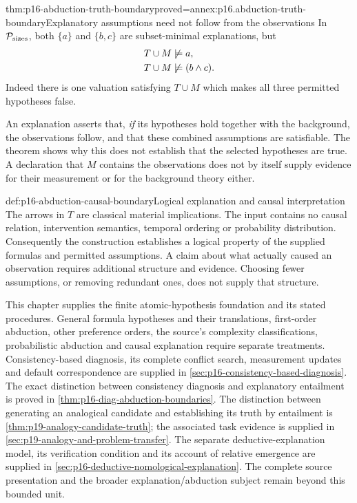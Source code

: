 \begin{hbtheorem}{thm:p16-abduction-truth-boundary}{proved=annex:p16.abduction-truth-boundary}{Explanatory assumptions need not follow from the observations}
In \(\mathcal P_{\rm sizes}\), both \(\{a\}\) and \(\{b,c\}\)
are subset-minimal explanations, but
\[
\begin{aligned}
 T\cup M&\not\models a,\\
 T\cup M&\not\models(b\land c).
\end{aligned}
\]
Indeed there is one valuation satisfying \(T\cup M\) which makes all
three permitted hypotheses false.
\end{hbtheorem}

An explanation asserts that, \emph{if} its hypotheses hold together with
the background, the observations follow, and that these combined assumptions
are satisfiable. The theorem shows why this does not establish that the
selected hypotheses are true. A declaration that \(M\) contains the
observations does not by itself supply evidence for their measurement or for
the background theory either.

\begin{hbwarning}{def:p16-abduction-causal-boundary}{Logical explanation and causal interpretation}
The arrows in \(T\) are classical material implications. The input
contains no causal relation, intervention semantics, temporal ordering or
probability distribution. Consequently the construction establishes a
logical property of the supplied formulas and permitted assumptions. A
claim about what actually caused an observation requires additional
structure and evidence. Choosing fewer assumptions, or removing redundant
ones, does not supply that structure.

This chapter supplies the finite atomic-hypothesis foundation and its stated
procedures. General formula hypotheses and their translations, first-order
abduction, other preference orders, the source's complexity classifications,
probabilistic abduction and causal explanation require separate treatments.
Consistency-based diagnosis, its complete conflict search, measurement
updates and default correspondence are supplied in
\cref{sec:p16-consistency-based-diagnosis}.
The exact distinction between consistency diagnosis and explanatory
entailment is proved in \cref{thm:p16-diag-abduction-boundaries}.
The distinction between generating an analogical candidate and
establishing its truth by entailment is
\cref{thm:p19-analogy-candidate-truth}; the associated task evidence
is supplied in \cref{sec:p19-analogy-and-problem-transfer}.
The separate deductive-explanation model, its verification
condition and its account of relative emergence are supplied in
\cref{sec:p16-deductive-nomological-explanation}.
The complete source
presentation and the broader explanation/abduction subject remain beyond
this bounded unit.
\end{hbwarning}
